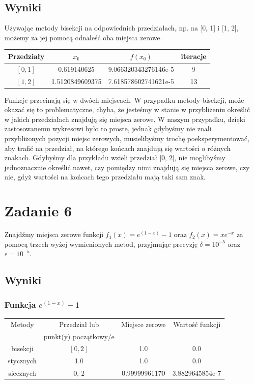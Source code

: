 \documentclass[12pt]{article}
\begin{document}
\subsection{Wyniki}
Używając metody bisekcji na odpowiednich przedziałach, np. na [0, 1] i [1, 2], możemy za jej pomocą odnaleść oba miejsca zerowe.
\begin{center}
\begin{tabular}{ |c|c|c|c| }
\hline
Przedziały & $x_0$ & $f(x_0)$ & iteracje\\ \hline
$[0, 1]$ & 0.619140625 & 9.066320343276146e-5 & 9\\
$[1, 2]$ & 1.5120849609375 & 7.618578602741621e-5 & 13\\ \hline
\end{tabular}
\end{center}
Funkcje przecinają się w dwóch miejscach. W przypadku metody bisekcji, może okazać się to problematyczne, chyba, że jesteśmy w stanie w przybliżeniu określić w jakich przedziałach znajdują się miejsca zerowe. W naszym przypadku, dzięki zastosowanemu wykresowi było to proste, jednak gdybyśmy nie znali przybliżonych pozycji miejsc zerowych, musielibyśmy trochę poeksperymentować, aby trafić na przedział, na którego końcach znajdują się wartości o różnych znakach. Gdybyśmy dla przykładu wzieli przedział [0, 2],  nie moglibyśmy jednoznacznie określić nawet, czy pomiędzy nimi znajdują się miejsca zerowe, czy nie, gdyż wartości na końcach tego przedziału mają taki sam znak.

\section{Zadanie 6}
Znajdźmy miejsca zerowe funkcji $f_1(x) =e^{(1-x)}-1$ oraz $f_2(x) = xe^{-x}$ za pomocą trzech wyżej wymienionych metod, przyjmując precyzję $\delta=10^{-5}$ oraz $\epsilon=10^{-5}$.
\subsection{Wyniki}

\subsubsection{Funkcja $e^{(1-x)}-1$}
\begin{center}
\begin{tabular}{ |c|c|c|c| }
\hline
Metody & Przedział lub & Miejsce zerowe & Wartość funkcji\\ 
 & punkt(y) początkowy/e & & \\ \hline
bisekcji & $[0, 2]$ & 1.0 & 0.0\\
stycznych & 1.0 & 1.0 & 0.0\\
siecznych & 0, 2 & 0.99999961170  & 3.8829645854e-7\\ \hline
\end{tabular}
\end{center}
\end{document}
